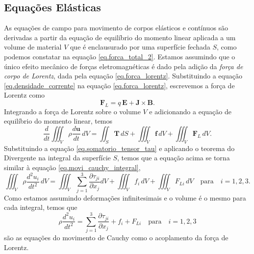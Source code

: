 \subsection{Equa\c{c}\~oes El\'asticas}

As equa\c{c}\~oes de campo para movimento de corpos el\' asticos e cont\'inuos s\~ao derivadas a partir da equa\c{c}\~ao de equil\'ibrio do momento linear aplicada a um volume de material $V$ que \'e enclausurado por uma superf\'icie fechada $S$, como podemos constatar na equa\c{c}\~ao \ref{eq.forca_total_2}. Estamos assumindo que o \'unico efeito mec\^anico de for\c{c}as eletromagn\'eticas \'e dado pela adi\c{c}\~ao da \textit{for\c{c}a de corpo de Lorentz}, dada pela equa\c{c}\~ao \ref{eq.forca_lorentz}. Substituindo a equa\c{c}\~ao \ref{eq.densidade_corrente} na equa\c{c}\~ao \ref{eq.forca_lorentz}, escrevemos a for\c{c}a de Lorentz como
\begin{equation}
\textbf{F}_L=q\,\mathbf{E}+\textbf{J}\times\textbf{B}.
\end{equation}
Integrando a for\c{c}a de Lorentz sobre o volume $V$ e adicionando a equa\c{c}\~ao de equil\'ibrio do momento linear, temos
\begin{equation}
\frac{d}{dt}\iiint_V\rho\frac{d\mathbf{u}}{dt}\,dV=\iint_S\mathbf{T}\,dS+\iiint_V\mathbf{f}\,dV+\iiint_V\textbf{F}_L\,dV.
\end{equation}
Substituindo a equa\c{c}\~ao \ref{eq.somatorio_tensor_tau} e aplicando o teorema do Divergente na integral da superf\'icie $S$, temos que a equa\c{c}\~ao acima se torna similar \`a equa\c{c}\~ao \ref{eq.movi_cauchy_integral},
\begin{equation*}
\iiint_V\rho\frac{d^2u_i}{dt^2}\,dV=\iiint_V\sum_{j=1}^3\frac{\partial\tau_{ji}}{\partial x_j}dV+\iiint_Vf_i\,dV+\iiint_V F_{Li}\,dV\quad \text{para}\quad i=1,2,3.
\end{equation*}
Como estamos assumindo deforma\c{c}\~oes infinitesimais e o volume \'e o mesmo para cada integral, temos que
\begin{equation*}
\rho\frac{d^2u_i}{dt^2}=\sum_{j=1}^3\frac{\partial\tau_{ji}}{\partial x_j}+f_i+F_{Li}\quad \text{para}\quad i=1,2,3
\end{equation*}
s\~ao as equa\c{c}\~oes do movimento de Cauchy como o acoplamento da for\c{c}a de Lorentz.

